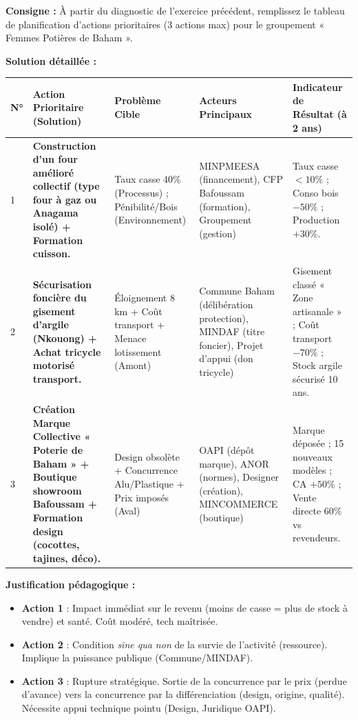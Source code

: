 \documentclass[11pt]{article}
\newcommand{\cle}[1]{{\popxbold\color{popdark}#1}}
\begin{document}
\begin{exoresolu}
\textbf{Consigne :} À partir du diagnostic de l'exercice précédent, remplissez le tableau de planification d'actions prioritaires (3 actions max) pour le groupement « Femmes Potières de Baham ».

\tcblower
\textbf{Solution détaillée :}

\begin{center}
\begin{tabularx}{\linewidth}{|l|X|X|X|X|}\hline
\textbf{N°} & \textbf{Action Prioritaire (Solution)} & \textbf{Problème Cible} & \textbf{Acteurs Principaux} & \textbf{Indicateur de Résultat (à 2 ans)} \\ \hline
1 & \textbf{Construction d'un four amélioré collectif (type four à gaz ou Anagama isolé) + Formation cuisson.} & Taux casse 40\% (Processus) ; Pénibilité/Bois (Environnement) & MINPMEESA (financement), CFP Bafoussam (formation), Groupement (gestion) & Taux casse $< 10\%$ ; Conso bois $-50\%$ ; Production $+30\%$. \\ \hline
2 & \textbf{Sécurisation foncière du gisement d'argile (Nkouong) + Achat tricycle motorisé transport.} & Éloignement 8 km + Coût transport + Menace lotissement (Amont) & Commune Baham (délibération protection), MINDAF (titre foncier), Projet d'appui (don tricycle) & Gisement classé « Zone artisanale » ; Coût transport $-70\%$ ; Stock argile sécurisé 10 ans. \\ \hline
3 & \textbf{Création Marque Collective « Poterie de Baham » + Boutique showroom Bafoussam + Formation design (cocottes, tajines, déco).} & Design obsolète + Concurrence Alu/Plastique + Prix imposés (Aval) & OAPI (dépôt marque), ANOR (normes), Designer (création), MINCOMMERCE (boutique) & Marque déposée ; 15 nouveaux modèles ; CA $+50\%$ ; Vente directe 60\% vs revendeurs. \\ \hline
\end{tabularx}
\end{center}

\textbf{Justification pédagogique :}
\begin{itemize}
    \item \textbf{Action 1} : Impact immédiat sur le revenu (moins de casse = plus de stock à vendre) et santé. Coût modéré, tech maîtrisée.
    \item \textbf{Action 2} : Condition \textit{sine qua non} de la survie de l'activité (ressource). Implique la puissance publique (Commune/MINDAF).
    \item \textbf{Action 3} : Rupture stratégique. Sortie de la concurrence par le prix (perdue d'avance) vers la concurrence par la \cle{différenciation} (design, origine, qualité). Nécessite appui technique pointu (Design, Juridique OAPI).
\end{itemize}
\end{exoresolu}
\end{document}
